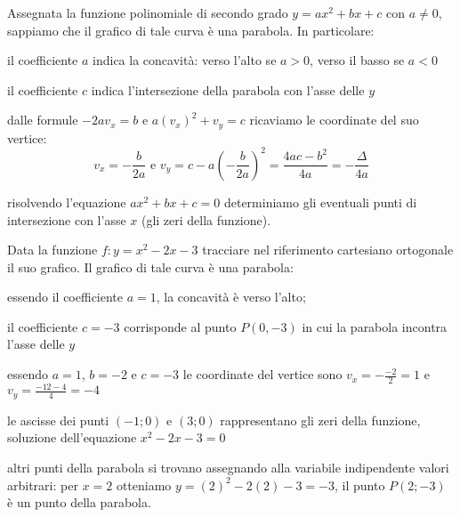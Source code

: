Assegnata la funzione polinomiale di secondo grado $y={ax}^2+{bx}+c$ con 
$a\neq 0$, sappiamo che il grafico di tale curva è una parabola. 
In particolare:
\begin{itemize*}
\item il coefficiente $a$ indica la concavità: verso l'alto se $a>0$, verso 
il 
basso se $a<0$
\item il coefficiente $c$ indica l'intersezione della parabola con l'asse 
delle 
$y$
\item dalle formule $-2av_x=b$ e $a(v_x)^2+v_y=c$ ricaviamo le coordinate del 
suo vertice:
\[v_x=-\frac b{2a} \text{ e } 
  v_y=c-a\left(-\frac{b}{2a}\right)^2=\frac{4ac-b^2}{4a}=-\frac{\Delta }{4a}\]
\item risolvendo l'equazione ${ax}^2+{bx}+c=0$ determiniamo gli eventuali 
punti 
di intersezione con l'asse $x$ (gli zeri della funzione).
\end{itemize*}

\begin{esempio}
Data la funzione $f: y=x^2-2x-3$ tracciare nel riferimento cartesiano 
ortogonale 
il suo grafico.
Il grafico di tale curva è una parabola:
\begin{itemize*}
\item essendo il coefficiente $a=1$, la concavità è verso l'alto;
\item il coefficiente $c=-3$ corrisponde al punto $P(0,-3)$ in cui la 
parabola 
incontra l'asse delle $y$
\item essendo $ a=1 $, $b=-2$ e $c=-3$ le coordinate del vertice sono 
$v_x=-\frac{-2} 2=1$ e $v_y=\frac{-12-4} 4=-4$
\item le ascisse dei punti $(-1;0)$ e $(3;0)$ rappresentano gli zeri della 
funzione, soluzione dell'equazione $x^2-2x-3=0$
\item altri punti della parabola si trovano assegnando alla variabile 
indipendente valori arbitrari: per $x=2$ otteniamo $y=(2)^2-2(2)-3=-3$, il 
punto 
$P(2;-3)$ è un punto della parabola.
\end{itemize*}

\begin{inaccessibleblock}
\begin{center}
  \parabola
\end{center}
\end{inaccessibleblock}

\end{esempio}

